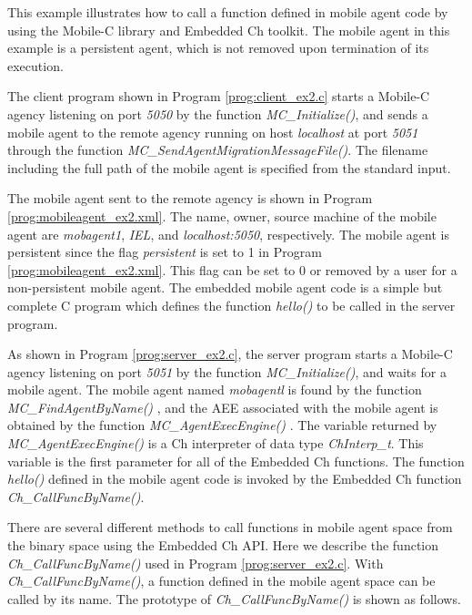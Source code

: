 \documentclass[11pt]{report}
\begin{document}
This example illustrates how to call a function defined in mobile agent 
code by using the Mobile-C library and Embedded Ch toolkit. 
The mobile agent in this example is a persistent agent, which is not removed 
upon termination of its execution.

The client program shown in Program \vref{prog:client_ex2.c} starts a Mobile-C 
agency listening on port \textit{5050} by the function 
\textit{MC\_Initialize()}, and sends a mobile agent to the remote agency 
running on host \textit{localhost} at port \textit{5051} through 
the function \textit{MC\_SendAgentMigrationMessageFile()}. 
The filename including the full path of the mobile agent is specified from the 
standard input.

The mobile agent sent to the remote agency is 
shown in Program \vref{prog:mobileagent_ex2.xml}. 
The name, owner, source machine of the mobile agent are 
\textit{mobagent1}, \textit{IEL}, and 
\textit{localhost:5050}, respectively. 
The mobile agent is persistent since the flag \textit{persistent} 
is set to 1 
in Program \ref{prog:mobileagent_ex2.xml}.
This flag can be set to 0 or removed by a user for a non-persistent mobile 
agent.
The embedded mobile agent code is a simple but complete C program which 
defines the function \textit{hello()} to be called in the server program. 

As shown in Program \vref{prog:server_ex2.c}, the server program starts a 
Mobile-C agency listening on port \textit{5051} by the 
function \textit{MC\_Initialize()}, and waits for a mobile agent.  
The mobile agent named \textit{mobagentl} is found by the function 
\textit{MC\_FindAgentByName()} , and the AEE 
associated with the mobile 
agent is obtained by the function \textit{MC\_AgentExecEngine()} 
.
The variable returned by \textit{MC\_AgentExecEngine()} is a Ch interpreter of 
data type \textit{ChInterp\_t}. 
This variable is the first parameter for all of the Embedded Ch functions. 
The function \textit{hello()} defined in the mobile agent code is invoked 
by the Embedded Ch function \textit{Ch\_CallFuncByName()}. 

There are several different methods to call functions in mobile agent 
space from the binary space using the Embedded Ch API. 
Here we describe the function \textit{Ch\_CallFuncByName()}
 used in Program 
\ref{prog:server_ex2.c}.
With \textit{Ch\_CallFuncByName()}, a function defined in the mobile 
agent space can be called by its name. 
The prototype of \textit{Ch\_CallFuncByName()} is shown as follows.
\end{document}
